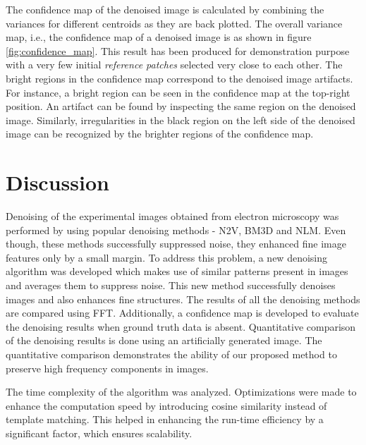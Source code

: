 \documentclass[fleqn,10pt]{wlscirep}
\begin{document}
	The confidence map of the denoised image is calculated by combining the variances\cite{chan1982updating} for different centroids as they are back plotted. The overall variance map, i.e., the confidence map of a denoised image is as shown in figure \ref{fig:confidence_map}. This result has been produced for demonstration purpose with a very few initial \textit{reference patches} selected very close to each other. The bright regions in the confidence map correspond to the denoised image artifacts. For instance, a bright region can be seen in the confidence map at the top-right position. An artifact can be found by inspecting the same region on the denoised image. Similarly, irregularities in the black region on the left side of the denoised image can be recognized by the brighter regions of the confidence map.
	

	
	\section*{Discussion}
	
	Denoising of the experimental images obtained from electron microscopy was performed by using popular denoising methods - N2V, BM3D and NLM. Even though, these methods successfully suppressed noise, they enhanced fine image features only by a small margin. To address this problem, a new denoising algorithm was developed which makes use of similar patterns present in images and averages them to suppress noise. This new method successfully denoises images and also enhances fine structures. The results of all the denoising methods are compared using FFT. Additionally, a confidence map is developed to evaluate the denoising results when ground truth data is absent. Quantitative comparison of the denoising results is done using an artificially generated image. The quantitative comparison demonstrates the ability of our proposed method to preserve high frequency components in images.  
	
	The time complexity of the algorithm was analyzed. Optimizations were made to enhance the computation speed by introducing cosine similarity instead of template matching. This helped in enhancing the run-time efficiency by a significant factor, which ensures scalability.
	
	

	
\end{document}
